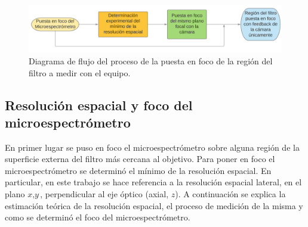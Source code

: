 \begin{figure}[H]
	\centering
	\includegraphics[width=1.0\textwidth]{Figs/microespectrometro/diagramfoco.png}
	\caption{Diagrama de flujo del proceso de la puesta en foco de la región del filtro a medir con el equipo.}
	\label{fig:diagpuestfoc}
\end{figure}




\singlespacing
\subsection{Resolución espacial y foco del microespectrómetro}
\label{sec:focoresol}

\hspace{0.5cm}En primer lugar se puso en foco el microespectrómetro sobre alguna región de la superficie externa del filtro más cercana al objetivo. Para poner en foco el microespectrómetro se determinó el mínimo de la resolución espacial. En particular, en este trabajo se hace referencia a la resolución espacial lateral, en el plano $\textit{x},\textit{y}$, perpendicular al eje óptico (axial, $\textit{z}$). A continuación se explica la estimación teórica de la resolución espacial, el proceso de medición de la misma y como se determinó el foco del microespectrómetro.

